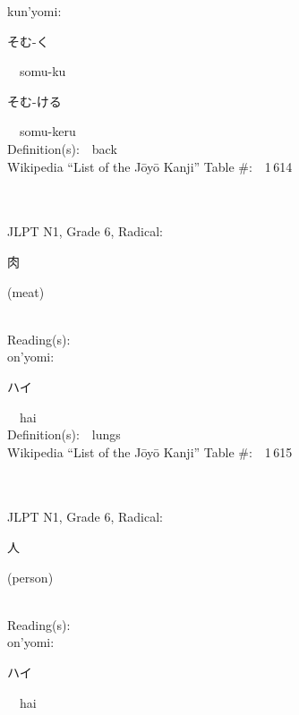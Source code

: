 \begin{multicols}{2}
{\hspace*{1em}}kun'yomi:\ \ \\
{\hspace*{2em}}{\begin{CJK}{UTF8}{min} そむ-く \end{CJK}}\ \ somu-ku\ \ \\
{\hspace*{2em}}{\begin{CJK}{UTF8}{min} そむ-ける \end{CJK}}\ \ somu-keru\ \ \\
Definition(s):\ \ back \\
Wikipedia ``List of the J\=oy\=o Kanji'' Table \#:\ \ 1\,614 \\
\ \ \\
{\fontsize{34pt}{40pt}  }\ \ \\  %
{JLPT N1, Grade 6, Radical:\ \ {\begin{CJK}{UTF8}{min} 肉 \end{CJK}} (meat) } \\
Reading(s):\ \ \\
{\hspace*{1em}}on'yomi:\ \ \\
{\hspace*{2em}}{\begin{CJK}{UTF8}{min} ハイ \end{CJK}}\ \ hai\ \ \\
Definition(s):\ \ lungs \\
Wikipedia ``List of the J\=oy\=o Kanji'' Table \#:\ \ 1\,615 \\
\ \ \\
{\fontsize{34pt}{40pt}  }\ \ \\  %
{JLPT N1, Grade 6, Radical:\ \ {\begin{CJK}{UTF8}{min} 人 \end{CJK}} (person) } \\
Reading(s):\ \ \\
{\hspace*{1em}}on'yomi:\ \ \\
{\hspace*{2em}}{\begin{CJK}{UTF8}{min} ハイ \end{CJK}}\ \ hai\ \ \\

\end{multicols}
